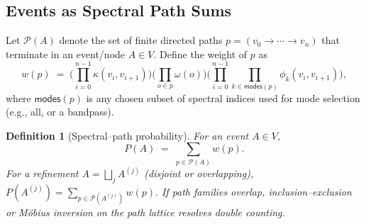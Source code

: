 \documentclass{article}
\newtheorem{definition}{Definition}
\begin{document}
\subsection{Events as Spectral Path Sums}
\label{subsec:events-as-path-sums}
Let $\mathcal{P}(A)$ denote the set of finite directed paths $p=(v_0\!\to\!\cdots\!\to\!v_n)$ that
terminate in an event/node $A\in V$. Define the weight of $p$ as
\begin{equation}
w(p)\;=\;\Bigg(\prod_{i=0}^{n-1}\kappa(v_i,v_{i+1})\Bigg)
         \Bigg(\prod_{o\in p}\omega(o)\Bigg)
         \Bigg(\prod_{i=0}^{n-1}\prod_{k\in \mathsf{modes}(p)}\phi_k(v_i,v_{i+1})\Bigg),
\label{eq:path-weight}
\end{equation}
where $\mathsf{modes}(p)$ is any chosen subset of spectral indices used for mode selection (e.g., all, or a bandpass).
\begin{definition}[Spectral–path probability]
\label{def:spectral-path-prob}
For an event $A\in V$,
\[
P(A)\;=\;\sum_{p\in\mathcal{P}(A)} w(p).
\]
For a refinement $A=\bigsqcup_{j}A^{(j)}$ (disjoint or overlapping),
\(
P\!\left(A^{(j)}\right)=\sum_{p\in\mathcal{P}(A^{(j)})}w(p).
\)
If path families overlap, inclusion–exclusion or Möbius inversion on the path lattice resolves double counting.
\end{definition}
\end{document}
